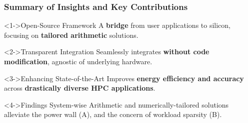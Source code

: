 \begin{frame}
    \frametitle{Summary of Insights and Key Contributions}

	\begin{alertblock}<1->{Open-Source Framework}
		A \textbf{bridge} from user applications to silicon, focusing on \textbf{tailored arithmetic} solutions.
	\end{alertblock}
	\vspace{-2mm}
	\begin{alertblock}<2->{Transparent Integration}
		Seamlessly integrates \textbf{without code modification}, agnostic of underlying hardware.
	\end{alertblock}
	\vspace{-2mm}
	\begin{block}<3->{Enhancing State-of-the-Art}
		Improves \textbf{energy efficiency and accuracy} across \textbf{drastically diverse HPC applications}.
	\end{block}
	\vspace{-2mm}
	\begin{exampleblock}<4->{Findings}
		System-wise Arithmetic and numerically-tailored solutions alleviate the power wall (A), and the concern of workload sparsity (B).
	\end{exampleblock}
\end{frame}
